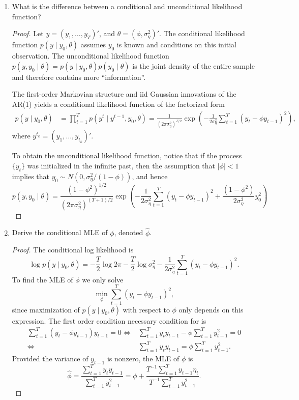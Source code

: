 \documentclass[oneside,reqno]{amsart}
\theoremstyle{definition}
\begin{document}
\begin{enumerate}
\item
What is the difference between a conditional and unconditional likelihood function?

\begin{proof}
Let $y = (y_1,\dotsc, y_T)'$, and $\theta = (\phi, \sigma_\eta^2)'$. The conditional likelihood function $p(y \mid y_0, \theta)$ 
assumes $y_0$ is known and conditions on this initial observation. The unconditional likelihood function $p(y, y_0 \mid \theta) = p(y \mid y_0, \theta) p (y_0 \mid \theta)$ is the joint density of the entire sample and therefore contains more ``information''.
\par
The first-order Markovian structure and iid Gaussian innovations of the AR(1) yields a conditional likelihood function of the factorized form
\begin{align*}
	p(y \mid y_0, \theta) &= \prod_{t=1}^T p(y^t \mid y^{t-1}, y_0, \theta) 
	= \frac{1}{(2 \pi \sigma_\eta^2)^{T/2}} \exp\left(-\frac{1}{2 \sigma_\eta^2} \sum_{t=1}^T (y_t - \phi y_{t-1})^2 \right),
\end{align*}
where $y^{t_k}  = (y_1,\dotsc, y_{t_k})'$.
\par
To obtain the unconditional likelihood function, notice that if the process $\{y_t\}$ was initialized in the infinite past, then the assumption that $|\phi | <1$ implies that $y_0 \sim N(0, \sigma_\eta^2/(1-\phi))$,  and hence 
\[
	p(y, y_0 \mid \theta) = \frac{(1-\phi^2)^{1/2}}{(2 \pi \sigma_\eta^2)^{(T+1)/2}} \exp\left(-\frac{1}{2 \sigma_\eta^2}  \sum_{t=1}^T (y_t - \phi y_{t-1})^2 + \frac{(1-\phi^2)}{2 \sigma_\eta^2} y_0^2 \right)
\]
\end{proof}

\item 
Derive the conditional MLE of $\phi$, denoted $\hat \phi$. 

\begin{proof} 
The conditional log likelihood is
\[
	\log p(y \mid y_0, \theta) = -\frac{T}{2} \log 2 \pi - \frac{T}{2}  \log \sigma_\eta^2 - \frac{1}{2 \sigma_\eta^2} \sum_{t=1}^T(y_t- \phi y_{t-1})^2.
\]
To find the MLE of $\phi$  we only solve 
\[
	\min_{\phi} \sum_{t=1}^T (y_t- \phi y_{t-1})^2,
\]
since maximization of $p(y \mid y_0,\theta)$ with respect to $\phi$ only depends on this expression. The first order condition necessary condition for is 
\begin{align*}
	\sum_{t=1}^T (y_t- \phi y_{t-1})y_{t-1} = 0 \iff & \sum_{t=1}^T y_t y_{t-1} - \phi \sum_{t=1}^T  y_{t-1}^2  = 0 \\
	\iff & \sum_{t=1}^T y_t y_{t-1} = \phi \sum_{t=1}^T  y_{t-1}^2.
\end{align*}
Provided the variance of $y_{t-1}$ is nonzero, the MLE of $\phi$ is 
\[
	\hat \phi = \frac{\sum_{t=1}^T y_t y_{t-1}}{\sum_{t=1}^T y_{t-1}^2} 
	= \phi + \frac{T^{-1} \sum_{t=1}^T y_{t-1} \eta_t}{T^{-1} \sum_{t=1}^T y_{t-1}^2}. 
\]
\end{proof}



\end{enumerate}
\end{document}
